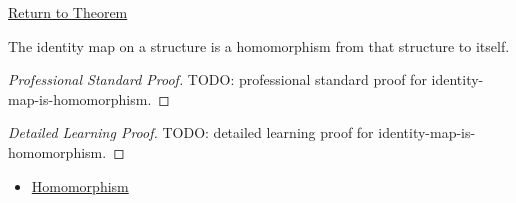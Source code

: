 \newpage
{}
\label{prf:identity-map-is-homomorphism}

\begin{remark*}[Return]
\hyperref[cor:identity-map-is-homomorphism]{Return to Theorem}
\end{remark*}

\begin{corollary*}
The identity map on a structure is a homomorphism from that structure to
itself.
\end{corollary*}

\begin{proof}[Professional Standard Proof]
\LRAProofBodyStart
TODO: professional standard proof for identity-map-is-homomorphism.
\end{proof}

\begin{proof}[Detailed Learning Proof]
\LRAProofBodyStart
TODO: detailed learning proof for identity-map-is-homomorphism.
\end{proof}

\begin{remark*}
\end{remark*}

\begin{dependencies}
\begin{itemize}
  \item \hyperref[def:homomorphism]{Homomorphism}
\end{itemize}
\end{dependencies}

\clearpage
